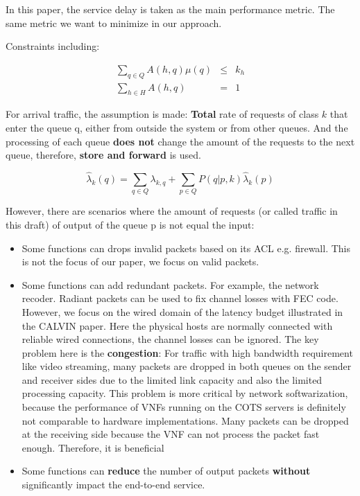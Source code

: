 \documentclass[12pt]{article}
\begin{document}
In this paper, the service delay is taken as the main performance metric. The same metric we want to minimize in our
approach.

Constraints including:

\begin{equation}
    \begin{aligned}
        \sum_{q \in Q} A(h,q)\mu(q) & \leq & k_{h} \\
        \sum_{h \in H} A(h,q) & = & 1
    \end{aligned}
\end{equation}

For arrival traffic, the assumption is made: \textbf{Total} rate of requests of class $k$ that enter the queue q, either
from outside the system or from other queues. And the processing of each queue \textbf{does not} change the amount of
the requests to the next queue, therefore, \textbf{store and forward} is used.

\begin{equation}
    \hat{\lambda}_{k}(q) = \sum_{q \in Q} \lambda_{k, q} + \sum_{p \in Q} P(q|p, k) \hat{\lambda}_{k}(p)
\end{equation}

However, there are scenarios where the amount of requests (or called traffic in this draft) of output of the queue p is not equal the input:

\begin{itemize}

    \item Some functions can drops invalid packets based on its ACL e.g. firewall. This is not the focus of our paper,
        we focus on valid packets.

    \item Some functions can add redundant packets. For example, the network recoder. Radiant packets can be used to fix
        channel losses with FEC code. However, we focus on the wired domain of the latency budget illustrated in the
        CALVIN paper. Here the physical hosts are normally connected with reliable wired connections, the channel losses
        can be ignored. The key problem here is the \textbf{congestion}: For traffic with high bandwidth requirement
        like video streaming, many packets are dropped in both queues on the sender and receiver sides due to the
        limited link capacity and also the limited processing capacity. This problem is more critical by network
        softwarization, because the performance of VNFs running on the COTS servers is definitely not comparable to
        hardware implementations. Many packets can be dropped at the receiving side because the VNF can not process the
        packet fast enough. Therefore, it is beneficial

    \item Some functions can \textbf{reduce} the number of output packets \textbf{without} significantly impact the
        end-to-end service.

\end{itemize}
\end{document}
